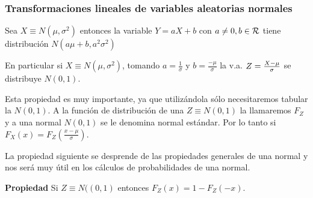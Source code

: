 \subsubsection{Transformaciones lineales de variables aleatorias normales}

\begin{proposition} Sea $X\equiv N(\mu,\sigma^2)$  entonces la variable $Y=a X+b$ con
$a\not=0,b\in\cal{R}$ tiene distribución $N(a\mu+b, a^2 \sigma^2)$

En particular si  $X\equiv N(\mu,\sigma^2)$, tomando $a=\frac{1}{\sigma}$ y $b=
\frac{-\mu}{\sigma}$ la v.a. $Z={{X-\mu}\over {\sigma}}$ se distribuye $N(0,1)$.

Esta propiedad es muy importante, ya que utilizándola sólo necesitaremos tabular la
$N(0,1)$. A la función de distribución de una $Z\equiv N(0,1)$ la llamaremos $F_Z$  y a una
normal $N(0,1)$  se le denomina normal estándar. Por lo tanto si
$F_X(x)=F_Z(\frac{x-\mu}{\sigma})$.
\end{proposition}

La propiedad siguiente se desprende de las propiedades generales de una normal y nos será
muy útil en los cálculos de probabilidades de una normal.

\textbf{Propiedad} Si $Z\equiv N((0,1)$ entonces $F_{Z}(x)=1-F_{Z}(-x)$.

